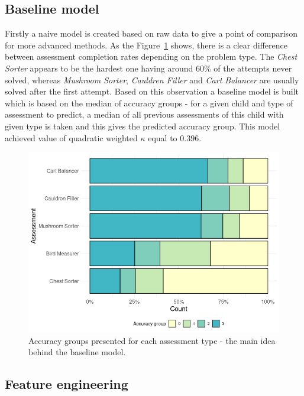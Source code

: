 \documentclass[fleqn,10pt]{SelfArx} %
\begin{document}
\subsection{Baseline model}

Firstly a naive model is created based on raw data to give a point of comparison for more advanced methods.
As the Figure~\ref{fig:assessment-accuracy-by-type} shows, there is a clear difference between assessment completion rates depending on the problem type.
The \textit{Chest Sorter} appears to be the hardest one having around 60\% of the attempts never solved, whereas \textit{Mushroom Sorter}, \textit{Cauldren Filler} and \textit{Cart Balancer} are usually solved after the first attempt.
Based on this observation a baseline model is built which is based on the median of accuracy groups - for a given child and type of assessment to predict, a median of all previous assessments of this child with given type is taken and this gives the predicted accuracy group.
This model achieved value of quadratic weighted $\kappa$ equal to $0.396$.

\begin{figure}
    \centering
    \includegraphics[width=\linewidth]{images/assessment-accuracy-group-count.png}
    \caption{Accuracy groups presented for each assessment type - the main idea behind the baseline model.}
    \label{fig:assessment-accuracy-by-type}
\end{figure}

\subsection{Feature engineering}
\end{document}
